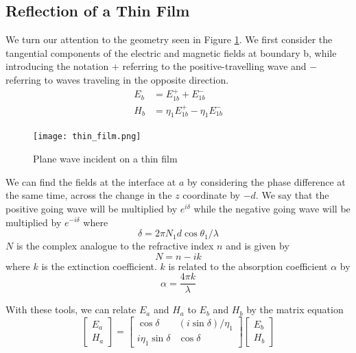 \documentclass{article}
\begin{document}
\subsection{Reflection of a Thin Film}
    We turn our attention to the geometry seen in Figure \ref{fig:film}. We first consider the tangential components of the electric and magnetic fields at boundary b, while introducing the notation $+$ referring to the positive-travelling wave and $-$ referring to waves traveling in the opposite direction.
    \begin{align}
        E_b &= E_{1b}^+ + E_{1b}^- \\
        H_b &= \eta_1 E_{1b}^+ - \eta_1 E_{1b}^-    
    \end{align}
    \begin{figure}
        \texttt{[image: thin\_film.png]}
        \caption{Plane wave incident on a thin film}
        \label{fig:film}
    \end{figure}
    We can find the fields at the interface at $a$ by considering the phase difference at the same time, across the change in the $z$ coordinate by $-d$. We say that the positive going wave will be multiplied by $e^{i \delta}$ while the negative going wave will be multiplied by $e^{-i \delta}$ where
    \begin{equation}
        \delta = 2 \pi N_1 d \cos \theta_1 / \lambda    
    \end{equation}
    $N$ is the complex analogue to the refractive index $n$ and is given by $$N = n - ik $$ where $k$ is the extinction coefficient. $k$ is related to the absorption coefficient $\alpha$ by 
    \begin{equation}
        \alpha = \frac{4 \pi k}{\lambda}
    \end{equation}
    
    With these tools, we can relate $E_a$ and $H_a$ to $E_b$ and $H_b$ by the matrix equation
    \begin{equation}
        \label{eq:charmatrix}
        \begin{bmatrix}
            E_a \\
            H_a
        \end{bmatrix}
        =
        \begin{bmatrix}
            \cos \delta & (i \sin \delta)/\eta_1 \\
            i \eta_1 \sin \delta & \cos \delta
        \end{bmatrix}
        \begin{bmatrix}
            E_b \\
            H_b
        \end{bmatrix}        
    \end{equation}
    
\end{document}
